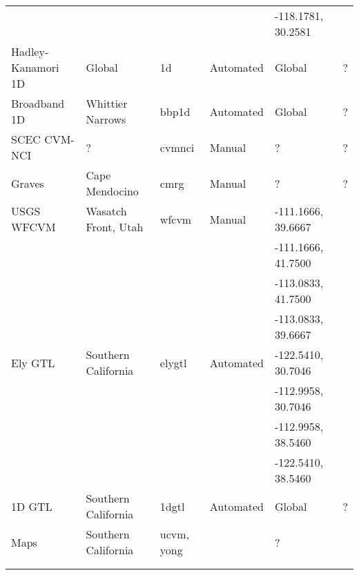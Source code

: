 \begin{table*}[ht!]
\begin{tabular}[]{lllllp{1.25in}}
                   &                       &               &              & -118.1781, 30.2581 &                              \\
Hadley-Kanamori 1D & Global                & 1d            &  Automated   & Global             & ?                            \\
Broadband 1D       & Whittier Narrows      & bbp1d         &  Automated   & Global             & ?                            \\
SCEC CVM-NCI       & ?                     & cvmnci        &  Manual      & ?                  & ?                            \\
Graves             & Cape Mendocino        & cmrg          &  Manual      & ?                  & ?                            \\
USGS WFCVM         & Wasatch Front, Utah   & wfcvm         &  Manual      & -111.1666, 39.6667 & \citet{Magistrale_2006_Tech} \\
                   &                       &               &              & -111.1666, 41.7500 &                              \\
                   &                       &               &              & -113.0833, 41.7500 &                              \\
                   &                       &               &              & -113.0833, 39.6667 &                              \\
\hline
Ely GTL            & Southern California   & elygtl        &  Automated   & -122.5410, 30.7046 & \citet{Ely_2010_AGU}         \\
                   &                       &               &              & -112.9958, 30.7046 &                              \\
                   &                       &               &              & -112.9958, 38.5460 &                              \\
                   &                       &               &              & -122.5410, 38.5460 &                              \\
1D GTL             & Southern California   & 1dgtl         &  Automated   & Global             & ?                            \\
\vsthirty{} Maps   & Southern California   & ucvm, yong    &              & ?                  & \citet{Wills_2006_BSSA}      \\
                   &                       &               &              &                    & \citet{Wald_2007_BSSA}       \\
                   &                       &               &              &                    & \citet{Yong_2012_BSSA}       \\
\hline
\end{tabular}
\label{tab:cvms}
\end{table*}


